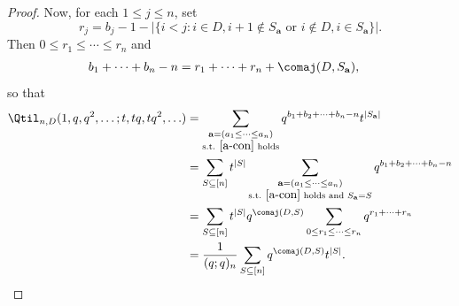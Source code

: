 \begin{proof}
    Now, for each $1 \le j \le n$, set 
    \[
    r_j = b_j - 1 - |\{ i < j : i \in D, i+1 \not\in S_\mathbf{a} \text{ or } i \not\in D, i \in S_\mathbf{a} \}|.
    \]
    Then $0 \le r_1 \le \cdots \le r_n$ and
    \begin{align*}
    b_1 + \cdots + b_n - n 
    &= r_1 + \cdots + r_n + \comaj(D,S_\mathbf{a}),
    \end{align*}
    so that
    \begin{align*}
    \Qtil_{n,D}(1,q,q^2,\ldots;t,tq,tq^2,\ldots) &= \sum_{\substack{\mathbf{a} = (a_1 \le \cdots \le a_n) \\ \text{s.t. } \eqref{a-con} \text{ holds}}} q^{b_1 + b_2 + \cdots + b_n - n}t^{|S_\mathbf{a}|} \\
    &= \sum_{S \subseteq [n]} t^{|S|} \sum_{\substack{\mathbf{a} = (a_1 \le \cdots \le a_n) \\ \text{s.t. } \eqref{a-con} \text{ holds and } S_\mathbf{a} = S}} q^{b_1 + b_2 + \cdots + b_n - n} \\
    &= \sum_{S \subseteq [n]} t^{|S|} q^{\comaj(D,S)} \sum_{0 \le r_1 \le \cdots \le r_n} q^{r_1+\cdots+r_n} \\
    &= \frac{1}{(q;q)_n} \sum_{S \subseteq [n]} q^{\comaj(D,S)} t^{|S|}.\qedhere
    \end{align*}
\end{proof}

